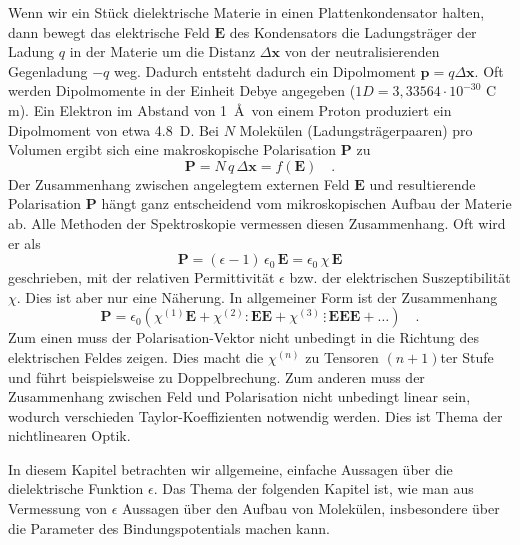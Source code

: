 Wenn wir ein Stück dielektrische Materie in einen Plattenkondensator halten, dann bewegt das elektrische Feld $\mathbf{E}$ des Kondensators die Ladungsträger der Ladung $q$ in der Materie um  die Distanz $\Delta  \mathbf{x}$ von der neutralisierenden Gegenladung $-q$ weg. Dadurch entsteht dadurch ein Dipolmoment $\mathbf{p} = q \Delta \mathbf{x}$. Oft werden Dipolmomente in der Einheit Debye angegeben ($1 D = 3{,}33564 \cdot 10^{-30}$ C  m). Ein Elektron im Abstand von 1~\AA\ von einem Proton produziert ein Dipolmoment von etwa 4.8~D. Bei $N$ Molekülen (Ladungsträgerpaaren) pro Volumen ergibt sich eine makroskopische Polarisation $\mathbf{P}$ zu
\begin{equation}
\mathbf{P} = N \, q \, \Delta \mathbf{x} = f(\mathbf{E}) \quad .
\end{equation}
Der Zusammenhang zwischen angelegtem externen Feld $\mathbf{E}$ und resultierende 
Polarisation $\mathbf{P}$ hängt ganz entscheidend vom mikroskopischen Aufbau der Materie ab. Alle Methoden der Spektroskopie vermessen diesen Zusammenhang. Oft wird er als 
\begin{equation}
 \mathbf{P} =  (\epsilon - 1) \, \epsilon_0 \, \mathbf{E} = \epsilon_0 \,\chi \, \mathbf{E} 
 \label{eq:diel_p_lin}
\end{equation}
geschrieben, mit der relativen Permittivität $\epsilon$ bzw. der elektrischen Suszeptibilität $\chi$. Dies ist aber nur eine Näherung. In allgemeiner Form ist der Zusammenhang
\begin{equation}
\mathbf{P}  = \epsilon_0 \left( \chi^{(1)} \mathbf{E} + \chi^{(2)} : \mathbf{E}  \mathbf{E} +  \chi^{(3)} \, \vdots  \, \mathbf{E}  \mathbf{E}  \mathbf{E}  + \dots \right) \quad .
\end{equation}
Zum einen muss der Polarisation-Vektor nicht unbedingt in die Richtung des elektrischen Feldes zeigen. Dies macht die $\chi^{(n)}$ zu Tensoren $(n+1)$ter Stufe und führt beispielsweise zu Doppelbrechung. Zum anderen muss der Zusammenhang zwischen Feld und Polarisation nicht unbedingt linear sein, wodurch verschieden Taylor-Koeffizienten notwendig werden. Dies ist Thema der nichtlinearen Optik.

In diesem Kapitel betrachten wir allgemeine, einfache Aussagen über die dielektrische Funktion $\epsilon$.
Das Thema der folgenden Kapitel ist, wie man aus Vermessung von $\epsilon$ Aussagen über den Aufbau  von Molekülen, insbesondere über die Parameter des Bindungspotentials machen kann.





